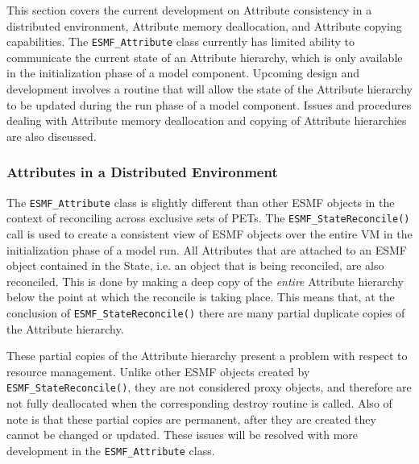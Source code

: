 %

This section covers the current development on Attribute consistency in a distributed environment, Attribute memory deallocation, and Attribute copying capabilities.  The {\tt ESMF\_Attribute} class currently has limited ability to communicate the current state of an Attribute hierarchy, which is only available in the initialization phase of a model component.  Upcoming design and development involves a routine that will allow the state of the Attribute hierarchy to be updated during the run phase of a model component.  Issues and procedures dealing with Attribute memory deallocation and copying of Attribute hierarchies are also discussed. 

\subsubsection{Attributes in a Distributed Environment} 
\label{sec:Att:Dist}

The  {\tt ESMF\_Attribute} class is slightly different than other ESMF objects in the context of reconciling across exclusive sets of PETs.  The {\tt ESMF\_StateReconcile()} call is used to create a consistent view of ESMF objects over the entire VM in the initialization phase of a model run.  All Attributes that are attached to an ESMF object contained in the State, i.e. an object that is being reconciled, are also reconciled.  This is done by making a deep copy of the {\it entire} Attribute hierarchy below the point at which the reconcile is taking place.  This means that, at the conclusion of {\tt ESMF\_StateReconcile()} there are many partial duplicate copies of the Attribute hierarchy.

These partial copies of the Attribute hierarchy present a problem with respect to resource management.  Unlike other ESMF objects created by {\tt ESMF\_StateReconcile()}, they are not considered proxy objects, and therefore are not fully deallocated when the corresponding destroy routine is called.  Also of note is that these partial copies are permanent, after they are created they cannot be changed or updated.  These issues will be resolved with more development in the {\tt ESMF\_Attribute} class.

